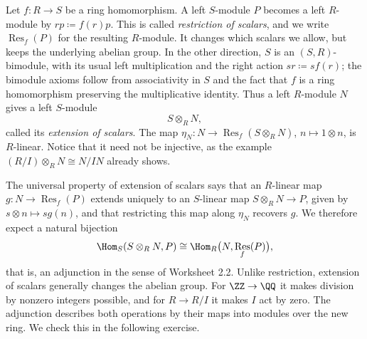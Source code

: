 \documentclass[12pt,reqno]{amsart}
\DeclareMathOperator{\Res}{Res}
\begin{document}
\hrulefill

Let $f:R\to S$ be a ring homomorphism. A left $S$-module $P$ becomes a left $R$-module by $rp\coloneqq f(r)p$. This is called \emph{restriction of scalars}, and we write $\Res_f(P)$ for the resulting $R$-module. It changes which scalars we allow, but keeps the underlying abelian group. In the other direction, $S$ is an $(S,R)$-bimodule, with its usual left multiplication and the right action $sr\coloneqq sf(r)$; the bimodule axioms follow from associativity in $S$ and the fact that $f$ is a ring homomorphism preserving the multiplicative identity. Thus a left $R$-module $N$ gives a left $S$-module
\[
S\otimes_RN,
\]
called its \emph{extension of scalars}. The map $\eta_N:N\to\Res_f(S\otimes_RN)$, $n\mapsto1\otimes n$, is $R$-linear. Notice that it need not be injective, as the example $(R/I)\otimes_RN\cong N/IN$ already shows.

The universal property of extension of scalars says that an $R$-linear map $g:N\to\Res_f(P)$ extends uniquely to an $S$-linear map $S\otimes_RN\to P$, given by $s\otimes n\mapsto sg(n)$, and that restricting this map along $\eta_N$ recovers $g$. We therefore expect a natural bijection
\[
\Hom_S(S\otimes_RN,P)\cong\Hom_R\bigl(N,\Res_f(P)\bigr),
\]
that is, an adjunction in the sense of Worksheet 2.2. Unlike restriction, extension of scalars generally changes the abelian group. For $\ZZ\to\QQ$ it makes division by nonzero integers possible, and for $R\to R/I$ it makes $I$ act by zero. The adjunction describes both operations by their maps into modules over the new ring. We check this in the following exercise.

\hrulefill
\end{document}
